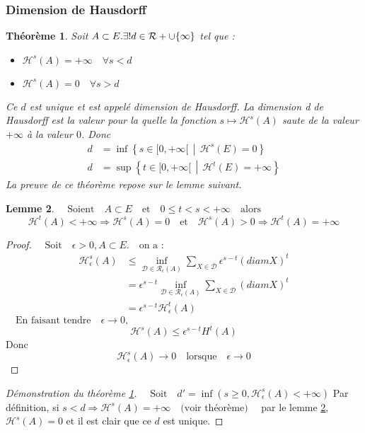 \documentclass[12pt,a4paper]{report}
\theoremstyle{plain}
\theoremstyle{plain}
\newtheorem{theo}{Théorème}[section]
\newtheorem{lemme}[theo]{Lemme}
\theoremstyle{definition}
\theoremstyle{remark}
\newcommand{\enstq}[2]{\left\{#1\,\middle|\,#2\right\}}
\newcommand{\R}[1]{\mathcal{R}}
\newcommand{\textm}[1]{\quad \text{#1} \quad}
\begin{document}
\subsubsection*{Dimension de Hausdorff}
\begin{theo}\label{Hausdorff}
Soit $A \subset E. \exists !d \in \R_+\cup \{\infty\}$ tel que :
\begin{itemize}
\item $\mathcal{H}^s(A) = + \infty \quad \forall s<d$
\item $\mathcal{H}^s(A)=0 \quad \forall s>d$
\end{itemize}
Ce $d$ est unique et est appelé dimension de Hausdorff. La dimension d de Hausdorff est la valeur pour la quelle la fonction $s \mapsto \mathcal{H}^s(A)$ saute de la valeur $+ \infty$ à la valeur $0$.
Donc
\begin{equation*}\label{x}
\begin{split}
d &= \inf \enstq{s \in [0, +\infty[}{\mathcal{H}^s(E)=0}\\
d &= \sup \enstq{t \in [0, +\infty[}{\mathcal{H}^t(E)=+\infty}
\end{split}
\end{equation*} 
La preuve de ce théorème repose sur le lemme suivant.
\end{theo}


\begin{lemme}\label{lemme}
$\textm{Soient} A \subset E \textm{et} 0\leq t <s<+\infty \textm{alors}$
\[\mathcal{H}^t(A) <+ \infty \Rightarrow \mathcal{H}^s (A)=0 \textm{et} \mathcal{H}^s(A)>0 \Rightarrow \mathcal{H}^t(A) = + \infty\]
\end{lemme}

\begin{proof}
$\textm{Soit} \epsilon > 0, A \subset E. \textm{on a :}$
\begin{equation*}\label{xx}
\begin{split}
\mathcal{H}^s_\epsilon (A)& \leq \inf_{\mathcal{D \in \mathcal{R}_\epsilon} (A)} \sum_{X \in \mathcal{D}} \epsilon ^{s-t} (diam X)^t \\
& = \epsilon^{s-t} \inf_{\mathcal{D \in \mathcal{R}_\epsilon} (A)} \sum_{X \in \mathcal{D}} (diam X)^t \\
& = \epsilon^{s-t} \mathcal{H}^t_\epsilon (A)
\end{split}
\end{equation*}
$\textm{En faisant tendre} \epsilon\rightarrow 0,$
\[\mathcal{H}^s (A) \leq \epsilon ^{s-t} H^t (A)\]
Donc \[\mathcal{H}^s _{\epsilon} (A) \rightarrow 0 \textm{lorsque} \epsilon \rightarrow 0\]
\end{proof}

\begin{proof}[Démonstration du théorème \ref{Hausdorff}]
$\textm{Soit} d' = \inf (s \geq 0, \mathcal{H}^s _\epsilon (A) < + \infty)$
Par définition, si $s<d \Rightarrow \mathcal{H}^s (A) = +\infty \textm {(voir théorème)}$
par le lemme \ref{lemme}, $\mathcal{H}^s(A)=0$ et il est clair que ce $d$ est unique.
\end{proof}
\end{document}
